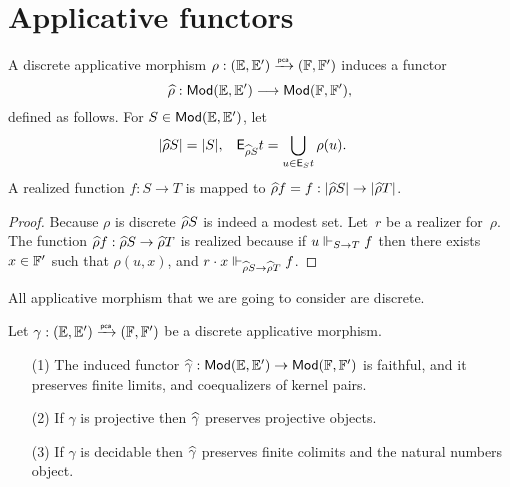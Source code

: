 \section{Applicative functors}
\label{sec:applicative-functors}

\begin{proposition}
  \label{th:applicative_morphism_induce_functor}%
  A discrete applicative morphism $\rho: ({\mathbb{E}}, {\mathbb{E}'}) \xrightarrow{\scriptscriptstyle\mathsf{pca}}{} ({\mathbb{F}},
  {\mathbb{F}'})$ induces a functor
  \begin{equation*}
     \widehat{\rho}: \mathsf{Mod}({\mathbb{E}}, {\mathbb{E}'}) \longrightarrow \mathsf{Mod}({\mathbb{F}}, {\mathbb{F}'}),
  \end{equation*}
  defined as follows. For $S \in \mathsf{Mod}({\mathbb{E}}, {\mathbb{E}'})$, let
  \begin{align*}
    |\widehat{\rho} S| &= |S|,
    &
    \mathsf{E}_{\widehat{\rho} S} t &= \bigcup_{u \in \mathsf{E}_S t} \rho(u).
  \end{align*}
  A realized function $f: S \to T$ is mapped to $\widehat{\rho} f = f:
  |\widehat{\rho} S| \to |\widehat{\rho} T|$.
\end{proposition}

\begin{proof}
  Because $\rho$ is discrete $\widehat{\rho} S$ is indeed a modest set.
  Let~$r$ be a realizer for~$\rho$. The function $\widehat{\rho} f :
  \widehat{\rho} S \to \widehat{\rho} T$ is realized because if $u \Vdash_{S \to T}
  f$ then there exists $x \in {\mathbb{F}'}$ such that $\rho(u, x)$, and $r
  \cdot x \Vdash_{\widehat{\rho} S \to \widehat{\rho} T} f$.
\end{proof}

All applicative morphism that we are going to consider are
discrete.

\begin{proposition}
  \label{th:applicative_morphisms_properties}%
  Let $\gamma: ({\mathbb{E}}, {\mathbb{E}'}) \xrightarrow{\scriptscriptstyle\mathsf{pca}}{}
  ({\mathbb{F}}, {\mathbb{F}'})$ be a discrete applicative morphism.
  \begin{enumerate}
  \item[(1)] The induced functor $\widehat{\gamma}: \mathsf{Mod}({\mathbb{E}}, {\mathbb{E}'}) \to
    \mathsf{Mod}({\mathbb{F}}, {\mathbb{F}'})$ is faithful, and it preserves finite limits,
    and coequalizers of kernel pairs.
  \item[(2)] If $\gamma$ is projective then $\widehat{\gamma}$ preserves
    projective objects.
  \item[(3)] If $\gamma$ is decidable then $\widehat{\gamma}$ preserves
    finite colimits and the natural numbers object.
  \end{enumerate}
\end{proposition}

